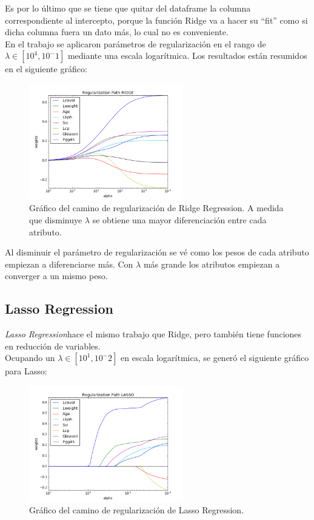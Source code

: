 \documentclass[letter, 10pt]{article}
\begin{document}
Es por lo último que se tiene que quitar del dataframe la columna
correspondiente al intercepto, porque la función Ridge va a hacer su ``fit''
como si dicha columna fuera un dato más, lo cual no es conveniente.\\


En el trabajo se aplicaron parámetros de regularización en el rango de $\lambda
\in [10^4,10^-1]$ mediante una escala logarítmica. Los resultados están resumidos
en el siguiente gráfico:

\begin{figure}[H]
  \centering
  \includegraphics[width=0.6\textwidth]{Images/p3_fig1} 
  \caption{Gráfico del camino de regularización de Ridge Regression. A medida
    que disminuye $\lambda$ se obtiene una mayor diferenciación entre cada atributo.}
  \label{fig:p3_g1}
\end{figure}

Al disminuir el parámetro de regularización se vé como los pesos de cada
atributo empiezan a diferenciarse más. Con $\lambda$ más grande los atributos
empiezan a converger a un mismo peso.
\subsection{Lasso Regression}
\textit{Lasso Regression}hace el mismo trabajo que Ridge, pero también tiene
funciones en reducción de variables.\\

Ocupando un $\lambda \in [10^1,10^-2]$ en escala logarítmica, se generó el
siguiente gráfico para Lasso:


\begin{figure}[H]
  \centering
  \includegraphics[width=0.6\textwidth]{Images/p3_fig2} 
  \caption{Gráfico del camino de regularización de Lasso Regression.}
  \label{fig:p3_g1}
\end{figure}
\end{document}
